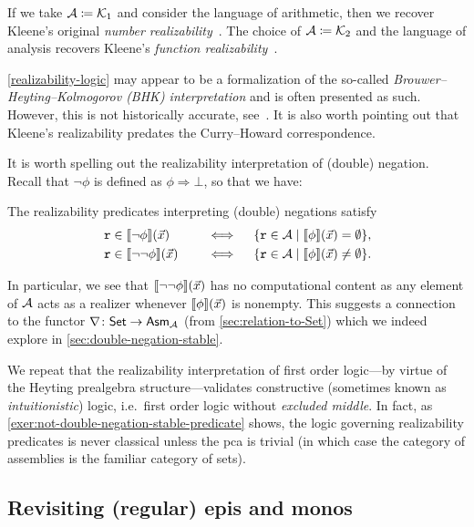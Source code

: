 If we take \(\AA \coloneqq \Kone\) and consider the language of arithmetic, then
we recover Kleene's original \emph{number realizability}~\cite{Kleene1945}.
%
The choice of \(\AA \coloneqq \Ktwo\) and the language of analysis recovers
Kleene's \emph{function realizability}~\cite{KleeneVesley1965}.
%

\cref{realizability-logic} may appear to be a formalization of the so-called
\emph{Brouwer--Heyting--Kolmogorov (BHK) interpretation} and is often presented
as such. However, this is not historically accurate,
see~\cite[p.~241]{vanOosten2002}. It is also worth pointing out that Kleene's
realizability predates the Curry--Howard correspondence.


It is worth spelling out the realizability interpretation of (double) negation.
%
Recall that \(\lnot\phi\) is defined as \(\phi \Rightarrow \bot\), so that we
have:
\begin{lemma}%
  The realizability predicates interpreting (double) negations satisfy
  \begin{alignat*}{2}
    &\pca{r} \in \sem{\lnot\phi}(\vec x) &&\quad\iff\quad
    \set{\pca{r} \in \AA \mid \sem{\phi}(\vec x) = \emptyset}, \\
    &\pca{r} \in \sem{\lnot\lnot\phi}(\vec x) &&\quad\iff\quad
    \set{\pca{r} \in \AA \mid \sem{\phi}(\vec x) \neq \emptyset}.
  \end{alignat*}
\end{lemma}

In particular, we see that \(\sem{\lnot\lnot\phi}(\vec x)\) has no computational
content as any element of \(\AA\) acts as a realizer whenever
\(\sem{\phi}(\vec x)\) is nonempty.
%
This suggests a connection to the functor \(\nabla \colon \Set \to \Asm{\AA}\)
(from \cref{sec:relation-to-Set}) which we indeed explore in
\cref{sec:double-negation-stable}.

We repeat that the realizability interpretation of first order logic---by virtue
of the Heyting prealgebra structure---validates constructive (sometimes known as
\emph{intuitionistic}) logic, i.e.\ first order logic without \emph{excluded
  middle}.
%
In fact, as \cref{exer:not-double-negation-stable-predicate} shows, the logic
governing realizability predicates is never classical unless the pca is
trivial (in which case the category of assemblies is the familiar category of
sets).

\subsection{Revisiting (regular) epis and monos}

